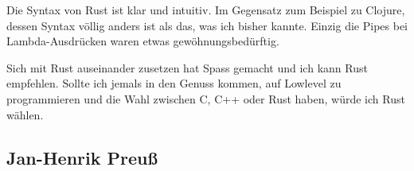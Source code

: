 \documentclass[letterpaper,12pt]{article}
\begin{document}
    Die Syntax von Rust ist klar und intuitiv.
    Im Gegensatz zum Beispiel zu Clojure, dessen Syntax völlig anders ist als das, was ich bisher kannte.
    Einzig die Pipes bei Lambda-Ausdrücken waren etwas gewöhnungsbedürftig.

    Sich mit Rust auseinander zusetzen hat Spass gemacht und ich kann Rust empfehlen.
    Sollte ich jemals in den Genuss kommen, auf Lowlevel zu programmieren und die Wahl zwischen C, C++ oder Rust haben,
        würde ich Rust wählen.

    \subsection{Jan-Henrik Preuß}\label{subsec:jan}


%
%
%
%
\end{document}

